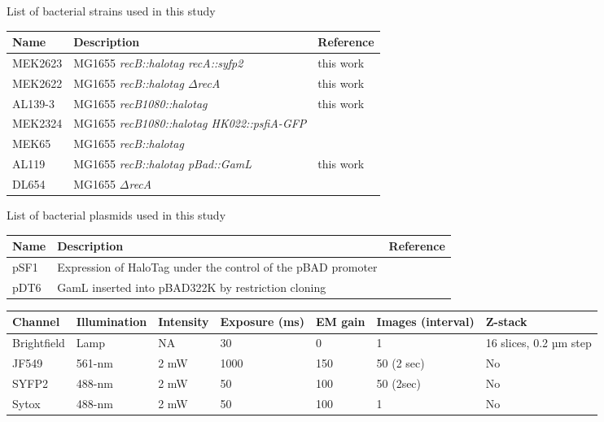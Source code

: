 \begin{supptable}[htbp]
    \centering
    \caption{List of bacterial strains used in this study}
    \begin{tabular}{lll}
        \toprule
        Name & Description & Reference\\
        \midrule
        MEK2623 & MG1655 \textit{recB::halotag recA::syfp2} & this work\\
        MEK2622 & MG1655 \textit{recB::halotag $\Delta$recA} & this work \\ %
        AL139-3 & MG1655 \textit{recB1080::halotag} & this work \\ %
        MEK2324 & MG1655 \textit{recB1080::halotag HK022::psfiA-GFP} &  \\ %
        MEK65 & MG1655 \textit{recB::halotag} & \cite{Lepore2019a} \\
        AL119 & MG1655 \textit{recB::halotag pBad::GamL} & this work \\ %
        DL654 & MG1655 \textit{$\Delta$recA} & \cite{Wertman1986} \\
        \bottomrule
    \end{tabular}
    \label{SItab:strains}
\end{supptable}

\begin{supptable}[htbp]
    \centering
    \caption{List of bacterial plasmids used in this study}
    \begin{tabular}{lll}
        \toprule
        Name & Description & Reference\\
        \midrule
        pSF1 & Expression of HaloTag under the control of the pBAD promoter & \cite{Lepore2019a} \\
        pDT6 & GamL inserted into pBAD322K by restriction cloning & \cite{Wilkinson2016} \\
        \bottomrule
    \end{tabular}
    \label{SItab:plasmids}
\end{supptable}

\begin{supptable}[htbp]
    \centering
    \caption{}
    \begin{tabular}{lllllll}
        \toprule
        Channel & Illumination & Intensity & Exposure (ms) & EM gain & Images (interval) & Z-stack\\
        \midrule
        Brightfield & Lamp & NA & 30 & 0 & 1 & 16 slices, 0.2 µm step\\
        JF549 & 561-nm & 2 mW & 1000 & 150 & 50 (2 sec) & No\\
        SYFP2 & 488-nm & 2 mW & 50 & 100 & 50 (2sec) & No\\
        Sytox & 488-nm & 2 mW & 50 & 100 & 1 & No\\
        \bottomrule
    \end{tabular}
    \label{SItab:acquisition_channels}
\end{supptable}

